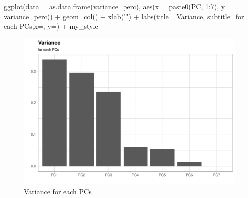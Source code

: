 \documentclass[
]{report}
\newenvironment{Shaded}{\begin{snugshade}}{\end{snugshade}}
\newcommand{\AttributeTok}[1]{\textcolor[rgb]{0.77,0.63,0.00}{#1}}
\newcommand{\CommentTok}[1]{\textcolor[rgb]{0.56,0.35,0.01}{\textit{#1}}}
\newcommand{\DecValTok}[1]{\textcolor[rgb]{0.00,0.00,0.81}{#1}}
\newcommand{\FunctionTok}[1]{\textcolor[rgb]{0.00,0.00,0.00}{#1}}
\newcommand{\NormalTok}[1]{#1}
\newcommand{\OtherTok}[1]{\textcolor[rgb]{0.56,0.35,0.01}{#1}}
\newcommand{\SpecialCharTok}[1]{\textcolor[rgb]{0.00,0.00,0.00}{#1}}
\newcommand{\StringTok}[1]{\textcolor[rgb]{0.31,0.60,0.02}{#1}}
\begin{document}
\begin{Shaded}
\end{Shaded}

\begin{Shaded}
\begin{Highlighting}[]
\FunctionTok{ggplot}\NormalTok{(}\AttributeTok{data =} \FunctionTok{as.data.frame}\NormalTok{(variance\_perc), }
       \FunctionTok{aes}\NormalTok{(}\AttributeTok{x =} \FunctionTok{paste0}\NormalTok{(}\StringTok{\textquotesingle{}PC\textquotesingle{}}\NormalTok{, }\DecValTok{1}\SpecialCharTok{:}\DecValTok{7}\NormalTok{), }\AttributeTok{y =}\NormalTok{ variance\_perc)) }\SpecialCharTok{+}
  \FunctionTok{geom\_col}\NormalTok{() }\SpecialCharTok{+}
  \FunctionTok{xlab}\NormalTok{(}\StringTok{""}\NormalTok{) }\SpecialCharTok{+} 
  \FunctionTok{labs}\NormalTok{(}\AttributeTok{title=} \StringTok{\textquotesingle{}Variance\textquotesingle{}}\NormalTok{, }\AttributeTok{subtitle=}\StringTok{\textquotesingle{}for each PCs\textquotesingle{}}\NormalTok{,}\AttributeTok{x=}\StringTok{\textquotesingle{}\textquotesingle{}}\NormalTok{, }\AttributeTok{y=}\StringTok{\textquotesingle{}\textquotesingle{}}\NormalTok{) }\SpecialCharTok{+}
\NormalTok{  my\_style}
\end{Highlighting}
\end{Shaded}

\begin{figure}
\centering
\includegraphics{credit_card_fraud_detection_files/figure-latex/pca_plot-1.pdf}
\caption{\label{Fig:pca_plot}Variance for each PCs}
\end{figure}
\end{document}
